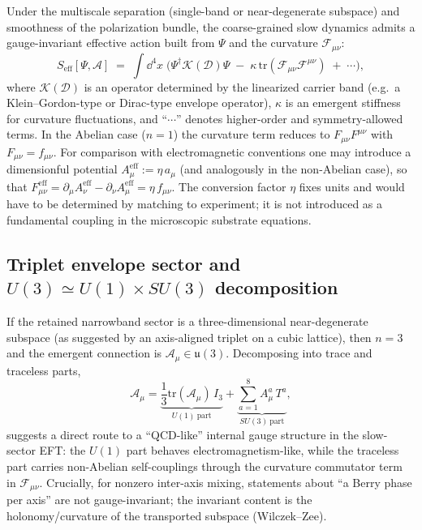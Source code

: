 Under the multiscale separation (single-band or near-degenerate subspace) and smoothness of the polarization bundle,
the coarse-grained slow dynamics admits a gauge-invariant effective action built from $\Psi$ and the curvature
$\mathcal{F}_{\mu\nu}$:
\begin{equation}
  S_{\text{eff}}[\Psi,\mathcal{A}]
  \;=\;\int \dd^4x\;
  \Big(
    \Psi^\dagger \mathcal{K}(\mathcal{D}) \Psi
    \;-\;\kappa\,\mathrm{tr}(\mathcal{F}_{\mu\nu}\mathcal{F}^{\mu\nu})
    \;+\;\cdots
  \Big),
  \label{eq:Seff}
\end{equation}
where $\mathcal{K}(\mathcal{D})$ is an operator determined by the linearized carrier band (e.g.\ a Klein--Gordon-type or
Dirac-type envelope operator), $\kappa$ is an emergent stiffness for curvature fluctuations, and ``$\cdots$'' denotes
higher-order and symmetry-allowed terms.
In the Abelian case ($n=1$) the curvature term reduces to $F_{\mu\nu}F^{\mu\nu}$ with $F_{\mu\nu}=f_{\mu\nu}$.
For comparison with electromagnetic conventions one may introduce a dimensionful potential
$A^{\mathrm{eff}}_\mu := \eta\,a_\mu$ (and analogously in the non-Abelian case),
so that $F^{\mathrm{eff}}_{\mu\nu}=\partial_\mu A^{\mathrm{eff}}_\nu-\partial_\nu A^{\mathrm{eff}}_\mu=\eta\,f_{\mu\nu}$.
The conversion factor $\eta$ fixes units and would have to be determined by matching to experiment; it is not introduced
as a fundamental coupling in the microscopic substrate equations.

\subsection{\texorpdfstring{Triplet envelope sector and $U(3)\simeq U(1)\times SU(3)$ decomposition}{Triplet envelope sector and U(3) ~= U(1) x SU(3) decomposition}}
\label{subsec:triplet-u3}

If the retained narrowband sector is a three-dimensional near-degenerate subspace (as suggested by an axis-aligned
triplet on a cubic lattice), then $n=3$ and the emergent connection is $\mathcal{A}_\mu\in\mathfrak{u}(3)$.
Decomposing into trace and traceless parts,
\begin{equation}
  \mathcal{A}_\mu
  = \underbrace{\frac{1}{3}\mathrm{tr}(\mathcal{A}_\mu)\,I_3}_{U(1)\ \text{part}}
  + \underbrace{\sum_{a=1}^{8}A^a_\mu\,T^a}_{SU(3)\ \text{part}},
\end{equation}
suggests a direct route to a ``QCD-like'' internal gauge structure in the slow-sector EFT:
the $U(1)$ part behaves electromagnetism-like, while the traceless part carries non-Abelian self-couplings through
the curvature commutator term in $\mathcal{F}_{\mu\nu}$.
Crucially, for nonzero inter-axis mixing, statements about ``a Berry phase per axis'' are not gauge-invariant; the
invariant content is the holonomy/curvature of the transported subspace (Wilczek--Zee).


